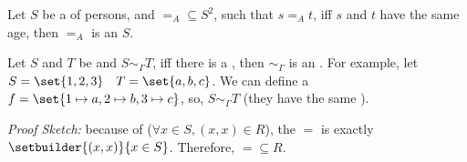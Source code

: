 Let $S$ be a  of persons, and $=_A \subseteq S^2$, such that $s =_A t$, iff $s$ and $t$ have the same age, then $=_A$ is an   $S$.

Let $S$ and $T$ be  and $S \sim_{\Gamma} T$, iff there is a  , then $\sim_{\Gamma}$ is an . For example, let $S = \set{1,2,3} \quad T = \set{a,b,c}$. We can define a  $f = \set{1 \mapsto a, 2 \mapsto b, 3 \mapsto c}$, so, $S \sim_{\Gamma} T$ (they have the same ).

\textit{Proof Sketch: }because of  ($\forall x \in S, (x,x) \in R$), the  $=$ is exactly $\setbuilder{(x,x)}{x \in S}$. Therefore, $= \subseteq R$.
